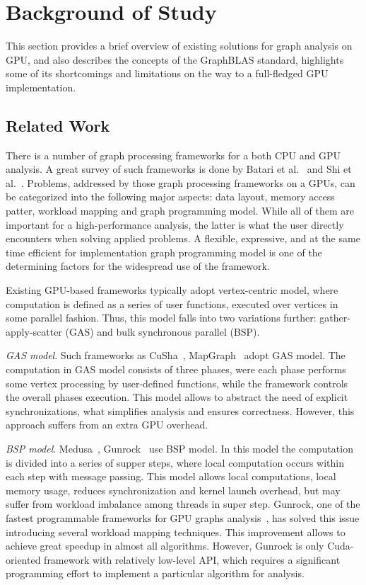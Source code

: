 \section{Background of Study}

This section provides a brief overview of existing solutions for graph analysis on GPU, and also describes the concepts of the GraphBLAS standard, highlights some of its shortcomings and limitations on the way to a full-fledged GPU implementation.

\subsection{Related Work}

There is a number of graph processing frameworks for a both CPU and GPU analysis. A great survey of such frameworks is done by Batari et al.~\cite{article:batarfi_survey_graphs} and Shi et al.~\cite{article:shi_survey_graphs}. Problems, addressed by those graph processing frameworks on a GPUs, can be categorized into the following major aspects: data layout, memory access patter, workload mapping and graph programming model. While all of them are important for a high-performance analysis, the latter is what the user directly encounters when solving applied problems. A flexible, expressive, and at the same time efficient for implementation graph programming model is one of the determining factors for the widespread use of the framework.

Existing GPU-based frameworks typically adopt vertex-centric model, where computation is defined as a series of user functions, executed over vertices in some parallel fashion. Thus, this model falls into two variations further: gather-apply-scatter (GAS) and bulk synchronous parallel (BSP). 

\textit{GAS model}. Such frameworks as CuSha~\cite{10.1145/2600212.2600227}, MapGraph~\cite{10.1145/2621934.2621936/MapGraph} adopt GAS model. The computation in GAS model consists of three phases, were each phase performs some vertex processing by user-defined functions, while the framework controls the overall phases execution. This model allows to abstract the need of explicit synchronizations, what simplifies analysis and ensures correctness. However, this approach suffers from an extra GPU overhead.

\textit{BSP model}. Medusa~\cite{6497047/Medusa}, Gunrock~\cite{7967137} use BSP model. In this model the computation is divided into a series of supper steps, where local computation occurs within each step with message passing. This model allows local computations, local memory usage, reduces synchronization and kernel launch overhead, but may suffer from workload imbalance among threads in super step. Gunrock, one of the fastest programmable frameworks for GPU graphs analysis~\cite{article:shi_survey_graphs},  has solved this issue introducing several workload mapping techniques. This improvement allows to achieve great speedup in almost all algorithms. However, Gunrock is only Cuda-oriented framework with relatively low-level API, which requires a significant programming effort to implement a particular algorithm for analysis.

